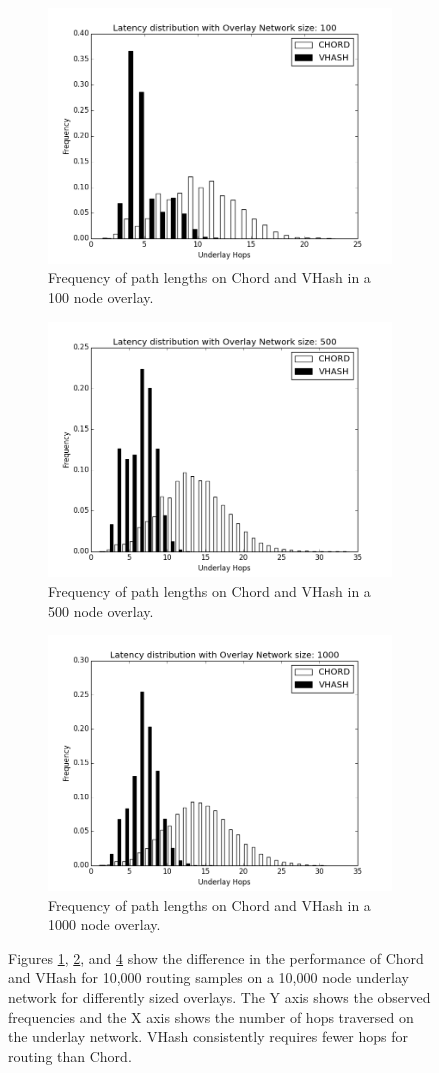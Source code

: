 \begin{figure}

\begin{subfigure}{\columnwidth}
\centering
	\includegraphics[width=0.5\linewidth]{figs/hist_100}
	\caption{Frequency of path lengths on Chord and VHash in a 100 node overlay.}	
	\label{fig:hist100}
\end{subfigure}

\begin{subfigure}{\columnwidth}
	\centering
	\includegraphics[width=0.5\linewidth]{figs/hist_500}
	\caption{Frequency of path lengths on Chord and VHash in a 500 node overlay.}
	\label{fig:hist500}
\end{subfigure}

\begin{subfigure}{\columnwidth}
	\centering
	\includegraphics[width=0.5\linewidth]{figs/hist_1000}
	\caption{Frequency of path lengths on Chord and VHash in a 1000 node overlay.}
	\label{fig:hist1000}
\end{subfigure}

\caption{Figures \ref{fig:hist100}, \ref{fig:hist500}, and \ref{fig:hist1000} show the difference in the performance of Chord and VHash for 10,000 routing samples on a 10,000 node underlay network for differently sized overlays. 
The Y axis shows the observed frequencies and the X axis shows the number of hops traversed on the underlay network.
VHash consistently requires fewer hops for routing than Chord.}
\end{figure}




